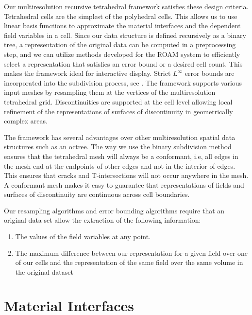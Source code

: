 \documentclass{siggraph}
\begin{document}
Our multiresolution recursive tetrahedral framework satisfies these
design criteria.  Tetrahedral cells are the simplest of the polyhedral
cells.  This allows us to use linear basis functions to approximate the
material interfaces and the dependent field variables in a cell.
Since our data structure is defined recursively as a binary tree, a
representation of the original data can be computed in a preprocessing
step, and we can utilize methods developed for the ROAM system
\cite{EVL-1997-123} to efficiently select a representation that
satisfies an error bound or a desired cell count.  This makes the
framework ideal for interactive display.  Strict $L^{\infty}$ error
bounds are incorporated into the subdivision process, see
\cite{EVL-1997-123}.  The framework supports various input meshes by
resampling them at the vertices of the multiresolution tetrahedral
grid.  Discontinuities are supported at the cell level allowing local
refinement of the representations of surfaces of discontinuity in
geometrically complex areas.


The framework has several advantages over other multiresolution
spatial data structures such as an octree.  The way we use the binary
subdivision method ensures that the tetrahedral mesh will always be a
conformant, i.e, all edges in the mesh end at the endpoints of other
edges and not in the interior of edges.  This ensures that cracks and
T-intersections will not occur anywhere in the mesh.  A conformant
mesh makes it easy to guarantee that representations of fields and
surfaces of discontinuity are continuous across cell boundaries.


Our resampling algorithms and error bounding algorithms require that an
original data set allow the extraction of the following information:


\begin{enumerate}

\item The values of the field variables at any point.

\item The maximum difference between our representation for a given
field over one of our cells and the representation of the same field
over the same volume in the original dataset

\end{enumerate}


\section {Material Interfaces}
\end{document}
